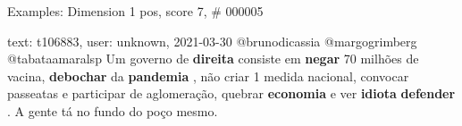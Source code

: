 \begin{frame}{Examples: Dimension 1 pos, score 7, \# 000005}
\footnotesize
\begin{exampleblock}{text: t106883, user: unknown, 2021-03-30}
@brunodicassia @margogrimberg @tabataamaralsp Um governo de \textbf{direita} 
consiste em \textbf{negar} 70 milhões de vacina, \textbf{debochar} da 
\textbf{pandemia} , não criar 1 medida nacional, convocar passeatas e 
participar de aglomeração, quebrar \textbf{economia} e ver \textbf{idiota} 
\textbf{defender} . A gente tá no fundo do poço mesmo. 
\end{exampleblock}
\end{frame}

